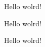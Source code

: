 \documentclass[10pt]{article}
\begin{document}
Hello wolrd!

Hello wolrd!

Hello wolrd!
\end{document}
